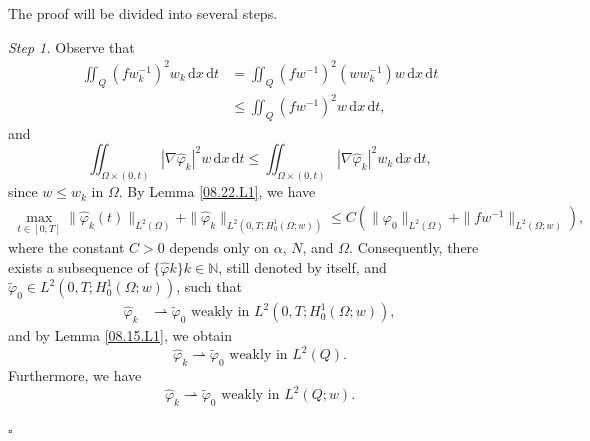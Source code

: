 \documentclass[11pt]{article}
\newenvironment{proof}{{\bf {Proof.}}}{\hfill $\square$}
\numberwithin{equation}{section}
\def\bf{\textbf}
\begin{document}
\begin{proof}  The proof will be divided into several steps.

{\it Step 1.}  Observe that
\begin{equation}\label{12.11.1}
\begin{split}
\iint_Q (fw_k^{-1})^2w_k\,\mathrm{d} x\,\mathrm{d} t &= \iint_{Q}(fw^{-1})^2(ww_k^{-1})w\,\mathrm{d} x\,\mathrm{d} t \\
&\leq \iint_Q (fw^{-1})^2w\,\mathrm{d} x\,\mathrm{d} t,
\end{split}
\end{equation}
and
\begin{equation*}
\iint_{\Omega\times (0,t)}|\nabla\widehat{\varphi}_k|^2w\,\mathrm{d} x\,\mathrm{d} t \leq \iint_{\Omega\times (0,t)}|\nabla \widehat{\varphi}_k|^2w_k\,\mathrm{d} x\,\mathrm{d} t,
\end{equation*}
since $w\leq w_k$ in $\Omega$. By Lemma \ref{08.22.L1}, we have
\begin{equation*}
\begin{split}
\max_{t\in [0,T]}\|\widehat{\varphi}_k(t)\|_{L^2(\Omega)}+\|\widehat{\varphi}_k\|_{L^2(0,T; H_0^1(\Omega;w))} \leq C\left(\|\varphi_0\|_{L^2(\Omega)}+\|fw^{-1}\|_{L^2(\Omega; w)}\right),
\end{split}
\end{equation*}
where the constant $C>0$ depends only on $\alpha$, $N$, and $\Omega$. Consequently, there exists a subsequence of $\{\widehat{\varphi}k\}{k\in\mathbb{N}}$, still denoted by itself, and $\widetilde{\varphi}_0\in L^2(0,T; H_0^1(\Omega;w))$, such that
\begin{equation}\label{08.16.4}
\begin{split}
\widehat{\varphi}_k
&\rightharpoonup \widetilde{\varphi}_0   \text{  weakly in } L^2(0,T; H_0^1(\Omega;w)),
\end{split}
\end{equation}
and by Lemma \ref{08.15.L1}, we obtain
\begin{equation}\label{08.23.1}
\widehat{\varphi}_k
\rightharpoonup \widetilde{\varphi}_0   \text{  weakly in } L^2(Q).
\end{equation}
Furthermore, we have
\begin{equation*}
\widehat{\varphi}_k
\rightharpoonup \widetilde{\varphi}_0   \text{  weakly in } L^2(Q; w).
\end{equation*}


\end{proof}
\end{document}
